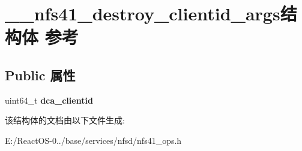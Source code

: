 \hypertarget{struct____nfs41__destroy__clientid__args}{}\section{\+\_\+\+\_\+nfs41\+\_\+destroy\+\_\+clientid\+\_\+args结构体 参考}
\label{struct____nfs41__destroy__clientid__args}
\subsection*{Public 属性}
\begin{DoxyCompactItemize}
\item 
\mbox{\label{struct____nfs41__destroy__clientid__args_ada6a65c67c9e7cd09ad573cd7df731bc}} 
uint64\+\_\+t {\bfseries dca\+\_\+clientid}
\end{DoxyCompactItemize}


该结构体的文档由以下文件生成\+:\begin{DoxyCompactItemize}
\item 
E\+:/\+React\+O\+S-\/0../base/services/nfsd/nfs41\+\_\+ops.\+h\end{DoxyCompactItemize}
